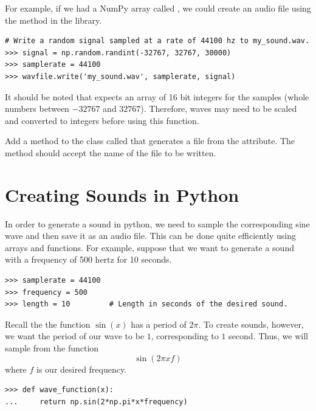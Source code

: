 For example, if we had a NumPy array called , we could create an audio file using the  method in the  library.

\begin{lstlisting}
# Write a random signal sampled at a rate of 44100 hz to my_sound.wav.
>>> signal = np.random.randint(-32767, 32767, 30000)
>>> samplerate = 44100
>>> wavfile.write('my_sound.wav', samplerate, signal)
\end{lstlisting}

It should be noted that  expects an array of 16 bit integers for the samples (whole numbers between $-32767$ and $32767$).
Therefore, waves may need to be scaled and converted to integers before using this function.

\begin{problem}

Add a method to the  class called  that generates a  file from the  attribute.
The  method should accept the name of the file to be written.

\end{problem}

\section*{Creating Sounds in Python}

In order to generate a sound in python, we need to sample the corresponding sine wave and then save it as an audio file.
This can be done quite efficiently using  arrays and functions.
For example, suppose that we want to generate a sound with a frequency of 500 hertz for 10 seconds.

\begin{lstlisting}
>>> samplerate = 44100
>>> frequency = 500
>>> length = 10         # Length in seconds of the desired sound.
\end{lstlisting}

Recall the the function $\sin(x)$ has a period of $2\pi$.
To create sounds, however, we want the period of our wave to be $1$, corresponding to $1$ second.
Thus, we will sample from the function
\[
\sin(2\pi xf)
\]
where $f$ is our desired frequency.
\begin{lstlisting}
>>> def wave_function(x):
...     return np.sin(2*np.pi*x*frequency)
\end{lstlisting}

